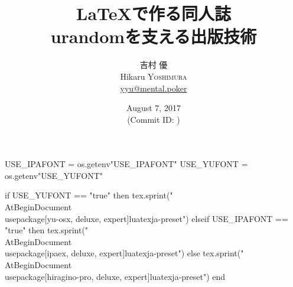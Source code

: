 \hypersetup{colorlinks,linkcolor=,urlcolor=links}

\beamertemplatenavigationsymbolsempty


\usepackage{luacode}
\usepackage{luatexja}
\usepackage{pgfpages}

\begin{luacode*}
  USE_IPAFONT = os.getenv"USE_IPAFONT"
  USE_YUFONT = os.getenv"USE_YUFONT"
  
  if USE_YUFONT == "true" then
    tex.sprint("\\AtBeginDocument{\\usepackage[yu-osx, deluxe, expert]{luatexja-preset}}")
  elseif USE_IPAFONT == "true" then
    tex.sprint("\\AtBeginDocument{\\usepackage[ipaex, deluxe, expert]{luatexja-preset}}")
  else
    tex.sprint("\\AtBeginDocument{\\usepackage[hiragino-pro, deluxe, expert]{luatexja-preset}}")
  end
\end{luacode*}

\usepackage{epigraph}
\usepackage{etoolbox}
\usepackage{tikz}
\usepackage{framed}
\usepackage[ss]{libertine}
\usepackage{amsmath}
\usepackage{mathtools}
\usepackage{listings}
\usepackage{tikz-qtree}

\renewcommand{\kanjifamilydefault}{\gtdefault}


\setmonofont[Ligatures=TeX]{CMU Typewriter Text}



\title[\LaTeX で作る同人誌]{%
  \LaTeX で作る同人誌 \\
  {\normalsize urandomを支える出版技術}
}
\author[吉村 優]{%
  吉村 優 \\
  Hikaru \textsc{Yoshimura} \\
  {\scriptsize \href{mailto:yyu@mental.poker}{yyu@mental.poker}}
}
\date[August 7, 2017]{%
  August 7, 2017 \\%
  {\footnotesize (Commit ID: \GITAbrHash)}
}

